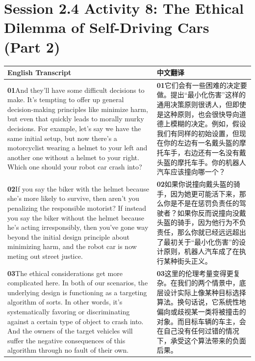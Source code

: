 \documentclass[UTF8,zihao=-4,fontset=fandol]{ctexart}
\newcommand{\TranscriptColumn}{\raggedright\arraybackslash\hyphenpenalty=10000\exhyphenpenalty=10000\sloppy}
\begin{document}
\clearpage
\section{Session 2.4 Activity 8: The Ethical Dilemma of Self-Driving Cars (Part 2)}

\renewcommand{\arraystretch}{1.23}
\begin{longtable}{>{\TranscriptColumn}p{} >{\TranscriptColumn}p{}}
\rowcolor{headerBg}\textbf{English Transcript} & \textbf{中文翻译} \\ \hline
\textbf{01}\quad And they'll have some difficult decisions to make. It's tempting to offer up general decision-making principles like minimize harm, but even that quickly leads to morally murky decisions. For example, let's say we have the same initial setup, but now there's a motorcyclist wearing a helmet to your left and another one without a helmet to your right. Which one should your robot car crash into? & \textbf{01}\quad 它们会有一些困难的决定要做。提出“最小化伤害”这样的通用决策原则很诱人，但即使是这种原则，也会很快导向道德上模糊的决定。例如，假设我们有同样的初始设置，但现在你的左边有一名戴头盔的摩托车手，右边还有一名没有戴头盔的摩托车手。你的机器人汽车应该撞向哪一个？ \\ \hline
\textbf{02}\quad If you say the biker with the helmet because she's more likely to survive, then aren't you penalizing the responsible motorist? If instead you say the biker without the helmet because he's acting irresponsibly, then you've gone way beyond the initial design principle about minimizing harm, and the robot car is now meting out street justice. & \textbf{02}\quad 如果你说撞向戴头盔的骑手，因为她更可能活下来，那么你是不是在惩罚负责任的驾驶者？如果你反而说撞向没戴头盔的骑手，因为他行为不负责任，那么你就已经远远超出了最初关于“最小化伤害”的设计原则，机器人汽车成了在执行某种街头正义。 \\ \hline
\textbf{03}\quad The ethical considerations get more complicated here. In both of our scenarios, the underlying design is functioning as a targeting algorithm of sorts. In other words, it's systematically favoring or discriminating against a certain type of object to crash into. And the owners of the target vehicles will suffer the negative consequences of this algorithm through no fault of their own. & \textbf{03}\quad 这里的伦理考量变得更复杂。在我们的两个情景中，底层设计实际上像某种目标选择算法。换句话说，它系统性地偏向或歧视某一类将被撞击的对象。而目标车辆的车主，会在自己没有任何过错的情况下，承受这个算法带来的负面后果。 \\ \hline

\end{longtable}
\end{document}
